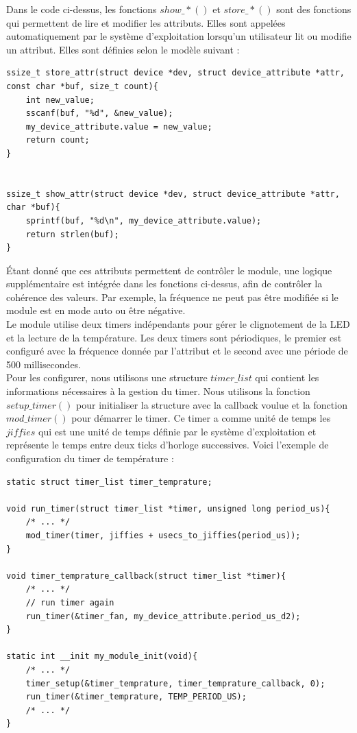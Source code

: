 \documentclass[
	a4paper, %
	10pt, %
]{CSUniSchoolLabReport}
\begin{document}
Dans le code ci-dessus, les fonctions $show\_*()$ et $store\_*()$ sont des fonctions qui permettent de lire et modifier les attributs. Elles sont appelées automatiquement par le système d'exploitation lorsqu'un utilisateur lit ou modifie un attribut. Elles sont définies selon le modèle suivant :

\begin{lstlisting}[style=CStyle]
ssize_t store_attr(struct device *dev, struct device_attribute *attr, const char *buf, size_t count){
	int new_value;
	sscanf(buf, "%d", &new_value);
	my_device_attribute.value = new_value;
	return count;
}


ssize_t show_attr(struct device *dev, struct device_attribute *attr, char *buf){
	sprintf(buf, "%d\n", my_device_attribute.value);
	return strlen(buf);
}
\end{lstlisting}

Étant donné que ces attributs permettent de contrôler le module, une logique supplémentaire est intégrée dans les fonctions ci-dessus, afin de contrôler la cohérence des valeurs. Par exemple, la fréquence ne peut pas être modifiée si le module est en mode auto ou être négative. \\

Le module utilise deux timers indépendants pour gérer le clignotement de la LED et la lecture de la température. Les deux timers sont périodiques, le premier est configuré avec la fréquence donnée par l'attribut et le second avec une période de 500 millisecondes. \\
Pour les configurer, nous utilisons une structure $timer\_list$ qui contient les informations nécessaires à la gestion du timer. Nous utilisons la fonction $setup\_timer()$ pour initialiser la structure avec la callback voulue et la fonction $mod\_timer()$ pour démarrer le timer. Ce timer a comme unité de temps les $jiffies$ qui est une unité de temps définie par le système d'exploitation et représente le temps entre deux ticks d'horloge successives. Voici l'exemple de configuration du timer de température :
\begin{lstlisting}[style=CStyle]
static struct timer_list timer_temprature;

void run_timer(struct timer_list *timer, unsigned long period_us){
	/* ... */
	mod_timer(timer, jiffies + usecs_to_jiffies(period_us));
}

void timer_temprature_callback(struct timer_list *timer){
	/* ... */
	// run timer again
	run_timer(&timer_fan, my_device_attribute.period_us_d2);		
}

static int __init my_module_init(void){
	/* ... */
    timer_setup(&timer_temprature, timer_temprature_callback, 0);
    run_timer(&timer_temprature, TEMP_PERIOD_US);
	/* ... */
}
\end{lstlisting}
\end{document}
